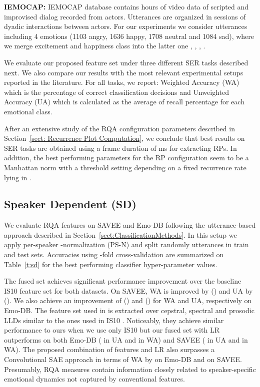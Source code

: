 \documentclass[a4paper]{article}
\begin{document}
\noindent\textbf{IEMOCAP:} IEMOCAP database \cite{IEMOCAP} contains  hours of video data of scripted and improvised dialog recorded from  actors. Utterances are organized in  sessions of dyadic interactions between  actors. For our experiments we consider  utterances including 4 emotions (1103 angry, 1636 happy, 1708 neutral and 1084 sad), where we merge excitement and happiness class into the latter one \cite{emily2017regionalsaliency}, \cite{xia2017multi}, \cite{fayek2017stateoftheart}, \cite{ghosh2016representation}. \vspace*{1mm}

We evaluate our proposed feature set under three different SER tasks described next. We also compare our results with the most relevant experimental setups reported in the literature. For all tasks, we report: Weighted Accuracy (WA) which is the percentage of correct classification decisions and Unweighted Accuracy (UA) which is calculated as the average of recall percentage for each emotional class. 

After an extensive study of the RQA configuration parameters described in Section~\ref{sect: Recurrence Plot Computation}, we conclude that best results on SER tasks are obtained using a frame duration of  ms for extracting RPs. In addition, the best performing parameters for the RP configuration seem to be a Manhattan norm with a threshold setting depending on a fixed recurrence rate lying in .      


\subsection{Speaker Dependent (SD)}
\label{sect:SDExperiments}
We evaluate RQA features on SAVEE and Emo-DB following the utterance-based approach described in Section~\ref{sect:ClassificationMethods}. In this setup we apply per-speaker -normalization (PS-N) and split randomly utterances in train and test sets. Accuracies using -fold cross-validation are summarized on Table~\ref{t:sd} for the best performing classifier hyper-parameter values.

The fused set achieves significant performance improvement over the baseline IS10 feature set for both datasets. On SAVEE, WA is improved by  ()  and UA by  ().  We also achieve an improvement of  () and  () for WA and UA, respectively on Emo-DB. The feature set used in \cite{sun2017ensemble} is extracted over cepstral, spectral and prosodic LLDs similar to the ones used in IS10 \cite{schuller2010interspeech}. Noticeably, they achieve similar performance to ours when we use only IS10 but our fused set with LR outperforms on both Emo-DB ( in UA and  in WA) and SAVEE ( in UA and  in WA). The proposed combination of features and LR also surpasses a Convolutional SAE approach \cite{mao2014autoencoder} in terms of WA by  on Emo-DB and  on SAVEE. Presumably, RQA measures contain information closely related to speaker-specific emotional dynamics not captured by conventional features.
\end{document}
